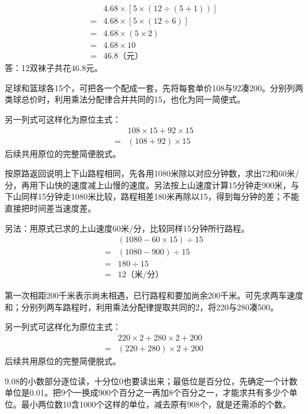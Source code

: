 \documentclass[multi=snippet,border=0pt]{standalone}
\newenvironment{snippet}[3]{\begin{minipage}{#1bp}\color{answerred}\fontsize{#2}{#3}\selectfont\raggedright}{\end{minipage}}
\begin{document}
\begin{snippet}{242}{10.5}{12.8}\[\begin{aligned}&4.68\times[5\times(12\div(5+1))]\\={}&4.68\times[5\times(12\div6)]\\={}&4.68\times(5\times2)\\={}&4.68\times10\\={}&46.8\text{（元）}\end{aligned}\]答：12双袜子共花46.8元。\end{snippet}
\begin{snippet}{505}{11.5}{14}足球和篮球各15个，可把各一个配成一套，先将每套单价108与92凑200。分别列两类球总价时，利用乘法分配律合并共同的15，也化为同一简便式。\par 另一列式可这样化为原位主式：\[\begin{aligned}&108\times15+92\times15\\={}&(108+92)\times15\end{aligned}\]后续共用原位的完整简便脱式。\end{snippet}
\begin{snippet}{505}{11.5}{14}按原路返回说明上下山路程相同，先各用1080米除以对应分钟数，求出72和60米/分，再用下山快的速度减上山慢的速度。另法按上山速度计算15分钟走900米，与下山同样15分钟走1080米比较，路程相差180米再除以15，得到每分钟的差；不能直接把时间差当速度差。\par 另法：用原式已求的上山速度60米/分，比较同样15分钟所行路程。\[\begin{aligned} &(1080-60\times15)\div15\\={}&(1080-900)\div15\\={}&180\div15\\={}&12\text{（米/分）}\end{aligned}\]\end{snippet}
\begin{snippet}{505}{11.5}{14}第一次相距200千米表示尚未相遇，已行路程和要加尚余200千米。可先求两车速度和；分别列两车路程时，利用乘法分配律提取共同的2，将220与280凑500。\par 另一列式可这样化为原位主式：\[\begin{aligned}&220\times2+280\times2+200\\={}&(220+280)\times2+200\end{aligned}\]后续共用原位的完整简便脱式。\end{snippet}
\begin{snippet}{505}{11.5}{14}9.08的小数部分逐位读，十分位0也要读出来；最低位是百分位，先确定一个计数单位是0.01。把9个一换成900个百分之一再加8个百分之一，才能求共有多少个单位。最小两位数10含1000个这样的单位，减去原有908个，就是还需添的个数。\end{snippet}
\end{document}
